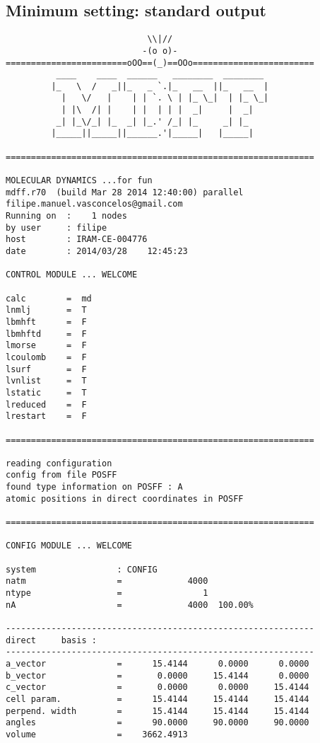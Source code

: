 \documentclass[a4paper,8pt]{article}
\begin{document}
\subsection{Minimum setting: standard output}
\begin{verbatim}
                            \\|//                            
                           -(o o)-                           
========================oOO==(_)==OOo========================
          ____    ____  ______   ________  ________  
         |_   \  /   _||_   _ `.|_   __  ||_   __  | 
           |   \/   |    | | `. \ | |_ \_|  | |_ \_| 
           | |\  /| |    | |  | | |  _|     |  _|    
          _| |_\/_| |_  _| |_.' /_| |_     _| |_     
         |_____||_____||______.'|_____|   |_____|    

=============================================================

MOLECULAR DYNAMICS ...for fun                 
mdff.r70  (build Mar 28 2014 12:40:00) parallel                                 
filipe.manuel.vasconcelos@gmail.com  
Running on  :    1 nodes                  
by user     : filipe                        
host        : IRAM-CE-004776
date        : 2014/03/28    12:45:23

CONTROL MODULE ... WELCOME

calc        =  md                                                          
lnmlj       =  T
lbmhft      =  F
lbmhftd     =  F
lmorse      =  F
lcoulomb    =  F
lsurf       =  F
lvnlist     =  T
lstatic     =  T
lreduced    =  F
lrestart    =  F

=============================================================

reading configuration
config from file POSFF
found type information on POSFF : A  
atomic positions in direct coordinates in POSFF

=============================================================

CONFIG MODULE ... WELCOME

system                : CONFIG                                                      
natm                  =             4000
ntype                 =                1
nA                    =             4000  100.00%

-------------------------------------------------------------
direct     basis : 
-------------------------------------------------------------
a_vector              =      15.4144      0.0000      0.0000
b_vector              =       0.0000     15.4144      0.0000
c_vector              =       0.0000      0.0000     15.4144
cell param.           =      15.4144     15.4144     15.4144
perpend. width        =      15.4144     15.4144     15.4144
angles                =      90.0000     90.0000     90.0000
volume                =    3662.4913



\end{verbatim}
\end{document}
